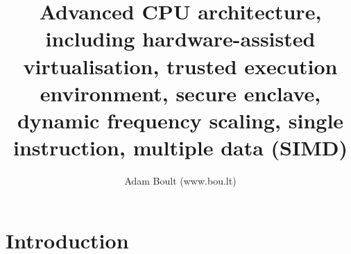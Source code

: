 \documentclass[oneside]{book}
\begin{document}
\author{Adam Boult (www.bou.lt)}
\title{Advanced CPU architecture, including hardware-assisted virtualisation, trusted execution environment, secure enclave, dynamic frequency scaling, single instruction, multiple data (SIMD)}
\maketitle

\setcounter{tocdepth}{0}
\tableofcontents



\part{Introduction}
\end{document}
